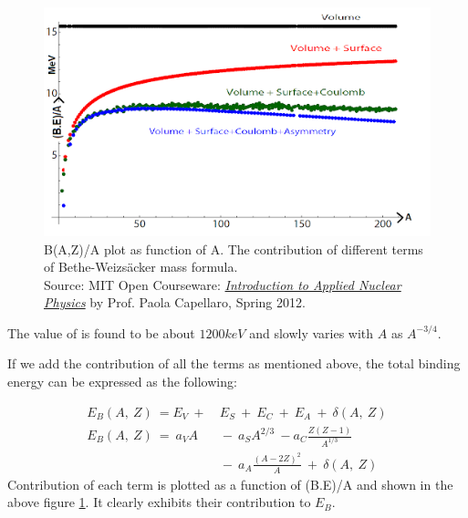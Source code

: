 \documentclass[ebook,12pt,oneside,openany]{memoir}
\begin{document}
\begin{enumerate}[label=\textbf{\Alph*.}]
            \begin{figure}
                \includegraphics[width = \textwidth]{images/BE_A_plot.png}
                \caption{B(A,Z)/A plot as function of A. The contribution of different terms of Bethe-Weizsäcker mass formula.\\Source: MIT Open Courseware: \href{https://ocw.mit.edu/courses/nuclear-engineering/22-02-introduction-to-applied-nuclear-physics-spring-2012/}{\textit{Introduction to Applied Nuclear Physics}} by Prof. Paola Capellaro, Spring 2012.}
                \label{fig:plot_BE_A}
            \end{figure}
            

            
            \hspace{3em} The value of  is found to be about $1200keV$ and slowly varies with $A$ as $A^{-3/4}$.
        
        \par If we add the contribution of all the terms as mentioned above, the total binding energy can be expressed as the following:
        
            \begin{equation}
                \begin{split}
                    E_B (A,~Z)~=E_V~+&~E_S~+~E_C~+~E_A~+~\delta(A,~Z)\\
                    E_B(A,~Z)~=~a_VA&~-~a_SA^{2/3}~-a_C\frac{Z(Z-1)}{A^{1/3}}\\
                                    &~-~a_A\frac{(A-2Z)^2}{A}~+~\delta(A,~Z) 
                \end{split}
            \end{equation}    
            \hspace{3em} Contribution of each term is plotted as a function of (B.E)/A and shown in the above figure \ref{fig:plot_BE_A}. It clearly exhibits their contribution to $E_B$.\\
            

\end{enumerate}
\end{document}
